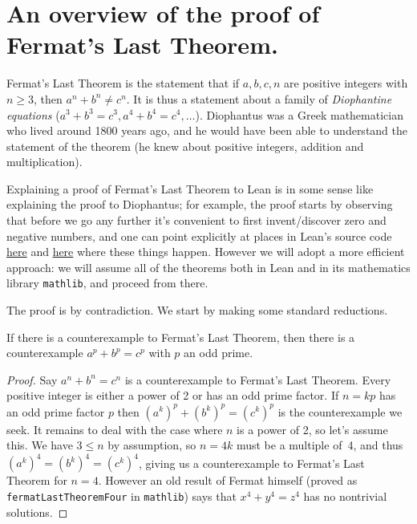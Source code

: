 \chapter{An overview of the proof of Fermat's Last Theorem.}

Fermat's Last Theorem is the statement that if $a,b,c,n$ are positive integers with $n\geq 3$, then $a^n+b^n\not=c^n$. It is thus a statement about a family of \emph{Diophantine equations} ($a^3+b^3=c^3, a^4+b^4=c^4,\ldots$). Diophantus was a Greek mathematician who lived around 1800 years ago, and he would have been able to understand the statement of the theorem (he knew about positive integers, addition and multiplication).

Explaining a proof of Fermat's Last Theorem to Lean is in some sense like explaining the proof to Diophantus; for example, the proof starts by observing that before we go any further it's convenient to first invent/discover zero and negative numbers, and one can point explicitly at places in Lean's source code \href{https://github.com/leanprover/lean4/blob/260eaebf4e804c9ac1319532970544a4e157c336/src/Init/Prelude.lean#L1049}{here} and \href{https://github.com/leanprover/lean4/blob/260eaebf4e804c9ac1319532970544a4e157c336/src/Init/Data/Int/Basic.lean#L45}{here} where these things happen. However we will adopt a more efficient approach: we will assume all of the theorems both in Lean and in its mathematics library {\tt mathlib}, and proceed from there.

The proof is by contradiction. We start by making some standard reductions.

\begin{lemma}\label{WLOG_n_prime}\leanok
  If there is a counterexample to Fermat's Last Theorem, then there is a counterexample $a^p+b^p=c^p$
  with $p$ an odd prime.
\end{lemma}
\begin{proof}
  Say $a^n + b^n = c^n$ is a counterexample to Fermat's Last Theorem. Every positive integer is either
  a power of 2 or has an odd prime factor. If $n=kp$ has an odd prime factor $p$ then
  $(a^k)^p+(b^k)^p=(c^k)^p$ is the counterexample we seek. It remains to deal with the case where
  $n$ is a power of 2, so let's assume this. We have $3\leq n$ by assumption, so
  $n=4k$ must be a multiple of~4, and thus $(a^k)^4=(b^k)^4=(c^k)^4$, giving us a counterexample
  to Fermat's Last Theorem for $n=4$. However an old result of Fermat himself (proved as {\tt fermatLastTheoremFour} in {\tt mathlib}) says that $x^4+y^4=z^4$ has no nontrivial solutions.
\end{proof}

